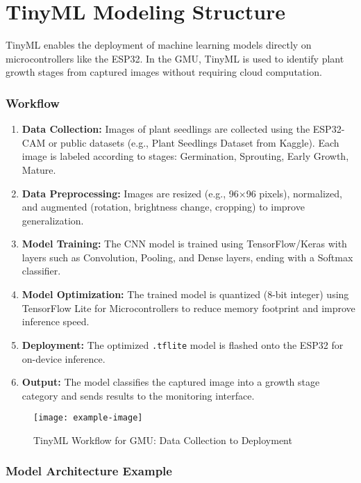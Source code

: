 \documentclass[../main]{subfiles}
\begin{document}
\chapter{TinyML Modeling Structure} \label{chp:}

TinyML enables the deployment of machine learning models directly on microcontrollers like the ESP32. In the GMU, TinyML is used to identify plant growth stages from captured images without requiring cloud computation.

\subsection{Workflow}
\begin{enumerate}
    \item \textbf{Data Collection:} Images of plant seedlings are collected using the ESP32-CAM or public datasets (e.g., Plant Seedlings Dataset from Kaggle). Each image is labeled according to stages: Germination, Sprouting, Early Growth, Mature.
    \item \textbf{Data Preprocessing:} Images are resized (e.g., 96×96 pixels), normalized, and augmented (rotation, brightness change, cropping) to improve generalization.
    \item \textbf{Model Training:} The CNN model is trained using TensorFlow/Keras with layers such as Convolution, Pooling, and Dense layers, ending with a Softmax classifier.
    \item \textbf{Model Optimization:} The trained model is quantized (8-bit integer) using TensorFlow Lite for Microcontrollers to reduce memory footprint and improve inference speed.
    \item \textbf{Deployment:} The optimized \texttt{.tflite} model is flashed onto the ESP32 for on-device inference.
    \item \textbf{Output:} The model classifies the captured image into a growth stage category and sends results to the monitoring interface.
\end{enumerate}

\begin{figure}[H]
    \centering
    \texttt{[image: example-image]}
    \caption{TinyML Workflow for GMU: Data Collection to Deployment}
\end{figure}

\subsection{Model Architecture Example}
\end{document}
